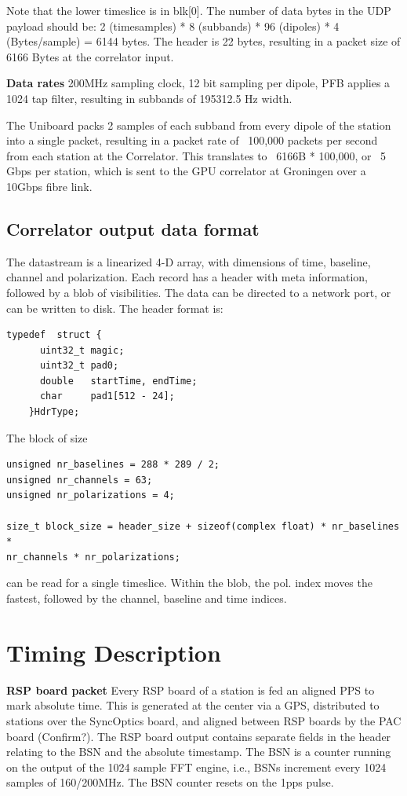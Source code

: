 \documentclass {article}
\begin{document}
Note that the lower timeslice is in  blk[0]. The number of data bytes in the UDP
payload  should  be:  2  (timesamples) * 8  (subbands) * 96  (dipoles)  *  4
(Bytes/sample) = 6144 bytes. The header is 22 bytes, resulting in a packet
size of 6166 Bytes at the correlator input.

\textbf {Data  rates} 200MHz sampling clock,  12 bit sampling per  dipole, PFB
applies a 1024 tap filter, resulting in subbands of 195312.5 Hz width.

The Uniboard packs 2 samples of each  subband from every dipole of the station
into  a single  packet, resulting  in a  packet rate  of ~100,000  packets per
second  from each  station  at the  Correlator. This  translates  to ~6166B  *
100,000,  or ~5  Gbps per  station, which  is sent  to the  GPU correlator  at
Groningen over a 10Gbps fibre link.

\subsection {Correlator output data  format} 
The datastream is  a linearized 4-D array, with dimensions  of time, baseline,
channel and  polarization.  Each  record has a  header with  meta information,
followed by  a blob  of visibilities. The  data can be  directed to  a network
port, or can be written to disk.  The header format is:
\begin{verbatim}
typedef  struct {
      uint32_t magic;
      uint32_t pad0;
      double   startTime, endTime;
      char     pad1[512 - 24];
    }HdrType;
\end{verbatim}
The block of size
\begin{verbatim}
unsigned nr_baselines = 288 * 289 / 2;
unsigned nr_channels = 63;
unsigned nr_polarizations = 4;

size_t block_size = header_size + sizeof(complex float) * nr_baselines *
nr_channels * nr_polarizations;
\end{verbatim}
can be read for a single timeslice. Within the blob, the pol. index moves the
fastest, followed by the channel, baseline and time indices.


\section {Timing Description}
\textbf {RSP board packet} Every RSP board  of a station is fed an aligned PPS
to mark absolute time. This is generated  at the center via a GPS, distributed
to stations over  the SyncOptics board, and aligned between  RSP boards by the
PAC board  (Confirm?). The RSP  board output  contains separate fields  in the
header relating to  the BSN and the  absolute timestamp. The BSN  is a counter
running on  the output  of the  1024 sample FFT  engine, i.e.,  BSNs increment
every 1024 samples of 160/200MHz. The BSN counter resets on the 1pps pulse.
\end{document}

